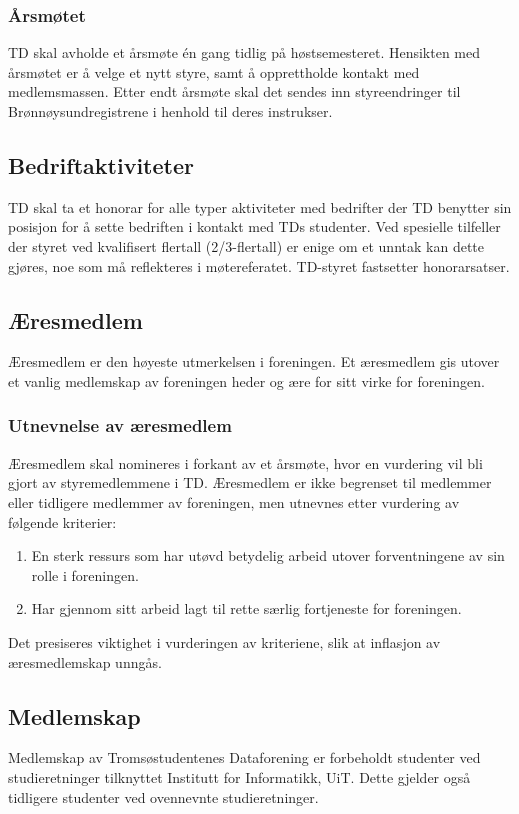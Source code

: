 \documentclass[11pt]{article}
\begin{document}
\subsubsection{Årsmøtet}
TD skal avholde et årsmøte én gang tidlig på høstsemesteret. Hensikten med årsmøtet er å velge et nytt styre, samt å opprettholde kontakt med medlemsmassen. Etter endt årsmøte skal det sendes inn styreendringer til Brønnøysundregistrene i henhold til deres instrukser.

\subsection{Bedriftaktiviteter}
TD skal ta et honorar for alle typer aktiviteter med bedrifter der TD benytter sin posisjon for å sette bedriften i kontakt med TDs studenter. Ved spesielle tilfeller der styret ved kvalifisert flertall (2/3-flertall) er enige om et unntak kan dette gjøres, noe som må reflekteres i møtereferatet. TD-styret fastsetter honorarsatser. 

\subsection{Æresmedlem}
Æresmedlem er den høyeste utmerkelsen i foreningen. Et æresmedlem gis utover et vanlig medlemskap av foreningen heder og ære for sitt virke for foreningen.

\subsubsection{Utnevnelse av æresmedlem}
Æresmedlem skal nomineres i forkant av et årsmøte, hvor en vurdering vil bli gjort av styremedlemmene i TD. Æresmedlem er ikke begrenset til medlemmer eller tidligere medlemmer av foreningen, men utnevnes etter vurdering av følgende kriterier:

\begin{enumerate}
	\item En sterk ressurs som har utøvd betydelig arbeid utover forventningene av sin rolle i foreningen.
	\item Har gjennom sitt arbeid lagt til rette særlig fortjeneste for foreningen.
\end{enumerate}

Det presiseres viktighet i vurderingen av kriteriene, slik at inflasjon av æresmedlemskap unngås.

\subsection{Medlemskap}
Medlemskap av Tromsøstudentenes Dataforening er forbeholdt studenter ved studieretninger tilknyttet Institutt for Informatikk, UiT. Dette gjelder også tidligere studenter ved ovennevnte studieretninger. 
\end{document}
